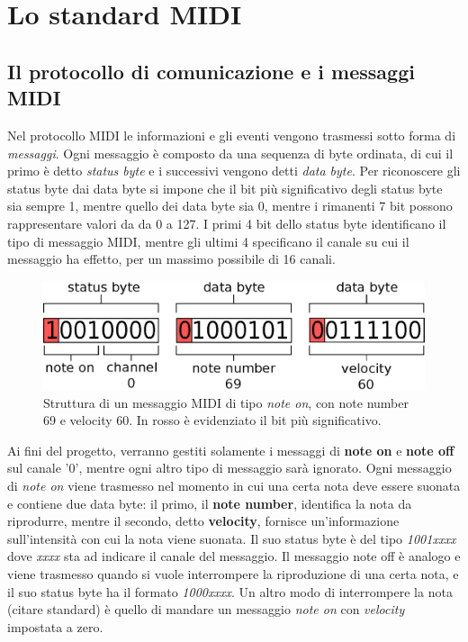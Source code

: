\chapter{Lo standard MIDI}
\label{chap:midi}

\section{Il protocollo di comunicazione e i messaggi MIDI}
Nel protocollo MIDI le informazioni e gli eventi vengono trasmessi sotto forma di \textit{messaggi}.
Ogni messaggio è composto da una sequenza di byte ordinata, di cui il primo è detto \textit{status byte} e i successivi
vengono detti \textit{data byte}.
Per riconoscere gli status byte dai data byte si impone che il bit più significativo degli status byte sia sempre 1, mentre quello dei data byte sia 0,
mentre i rimanenti 7 bit possono rappresentare valori da da 0 a 127.
I primi 4 bit dello status byte identificano il tipo di messaggio MIDI, mentre gli ultimi 4 specificano il canale su cui il messaggio ha effetto,
per un massimo possibile di 16 canali.

\begin{figure}
    \centering
    \def\svgwidth{\columnwidth}
    \includegraphics[width=0.7\columnwidth]{TeX_files/midi_message.eps}
    \caption{Struttura di un messaggio MIDI di tipo \textit{note on},
    	     con note number 69 e velocity 60. In rosso è evidenziato
             il bit più significativo.}
\end{figure}

Ai fini del progetto, verranno gestiti solamente i messaggi di \textbf{note on} e \textbf{note off} sul canale '0', mentre
ogni altro tipo di messaggio sarà ignorato.
Ogni messaggio di \textit{note on} viene trasmesso nel momento in cui una certa nota deve essere suonata e contiene due data byte: 
il primo, il \textbf{note number}, identifica la nota da riprodurre, mentre il secondo, detto \textbf{velocity}, fornisce un'informazione
sull'intensità con cui la nota viene suonata. Il suo status byte è del tipo
\textit{1001xxxx} dove \textit{xxxx} sta ad indicare il canale del
messaggio.
Il messaggio note off è analogo e viene trasmesso quando si vuole
interrompere la riproduzione di una certa nota, e il suo status byte
ha il formato \textit{1000xxxx}.
Un altro modo di interrompere la nota (citare standard) è quello di mandare
un messaggio \textit{note on} con \textit{velocity} impostata a zero.


